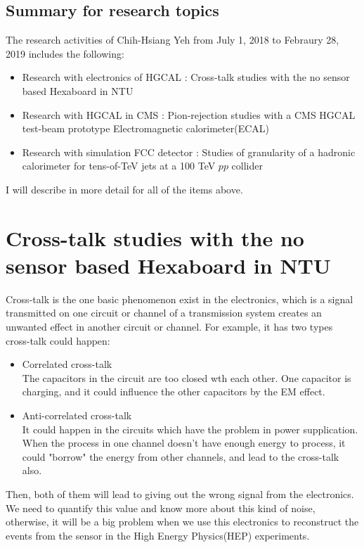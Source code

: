 \documentclass[12pt,twoside,a4paper,an,final]{cms-tdr}
\begin{document}
\subsection{Summary for research topics}
The research activities of Chih-Hsiang Yeh from July 1, 2018 to Febraury 28, 2019 includes the following:
\begin{itemize}
 \item Research with electronics of HGCAL : Cross-talk studies with the no sensor based Hexaboard in NTU 
 \item Research with HGCAL in CMS : Pion-rejection studies with a CMS HGCAL test-beam prototype Electromagnetic calorimeter(ECAL)
 \item Research with simulation FCC detector : Studies of granularity of a hadronic calorimeter for tens-of-TeV jets at a 100 TeV $pp$ collider
\end{itemize}

I will describe in more detail for all of the items above.
\section{Cross-talk studies with the no sensor based Hexaboard in NTU \label{sec:cross-talk}}
Cross-talk is the one basic phenomenon exist in the electronics, which is a signal transmitted on one circuit or channel of a transmission system creates an unwanted effect in another circuit or channel. For example, it has two types cross-talk could happen:
\begin{itemize}
\item Correlated cross-talk\\
The capacitors in the circuit are too closed wth each other. One capacitor is charging, and it could influence the other capacitors by the EM effect. 
\item Anti-correlated cross-talk\\
It could happen in the circuits which have the problem in power supplication. When the process in one channel doesn't have enough energy to process, it could "borrow" the energy from other channels, and lead to the cross-talk also.  
\end{itemize}


Then, both of them will lead to giving out the wrong signal from the electronics. We need to quantify this value and know more about this kind of noise, otherwise, it will be a big problem when we use this electronics to reconstruct the events from the sensor in the High Energy Physics(HEP) experiments. 
\end{document}
